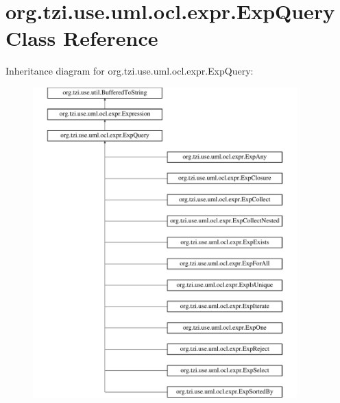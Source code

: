 \hypertarget{classorg_1_1tzi_1_1use_1_1uml_1_1ocl_1_1expr_1_1_exp_query}{\section{org.\-tzi.\-use.\-uml.\-ocl.\-expr.\-Exp\-Query Class Reference}
\label{classorg_1_1tzi_1_1use_1_1uml_1_1ocl_1_1expr_1_1_exp_query}
}
Inheritance diagram for org.\-tzi.\-use.\-uml.\-ocl.\-expr.\-Exp\-Query\-:\begin{figure}[H]
\begin{center}
\leavevmode
\includegraphics[height=12.000000cm]{classorg_1_1tzi_1_1use_1_1uml_1_1ocl_1_1expr_1_1_exp_query}
\end{center}
\end{figure}
